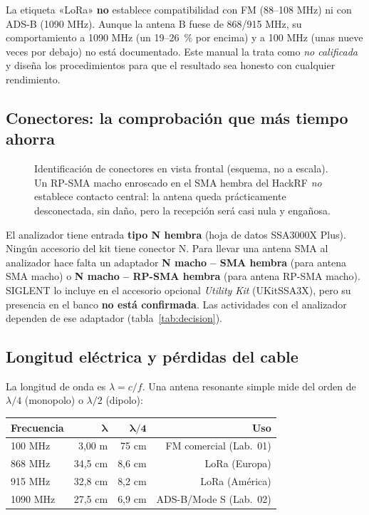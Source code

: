 \begin{importante}
La etiqueta «LoRa» \textbf{no} establece compatibilidad con FM (88--108 MHz) ni con ADS-B (1090 MHz). Aunque la antena B fuese de 868/915 MHz, su comportamiento a 1090 MHz (un 19--26~\% por encima) y a 100 MHz (unas nueve veces por debajo) no está documentado. Este manual la trata como \emph{no calificada} y diseña los procedimientos para que el resultado sea honesto con cualquier rendimiento.
\end{importante}

\subsection{Conectores: la comprobación que más tiempo ahorra}

\begin{figure}[H]
\centering
\resizebox{\linewidth}{!}{}
\caption{Identificación de conectores en vista frontal (esquema, no a escala). Un RP-SMA macho enroscado en el SMA hembra del HackRF \emph{no} establece contacto central: la antena queda prácticamente desconectada, sin daño, pero la recepción será casi nula y engañosa.}
\label{fig:conectores}
\end{figure}

El analizador tiene entrada \textbf{tipo N hembra} (hoja de datos SSA3000X Plus). Ningún accesorio del kit tiene conector N. Para llevar una antena SMA al analizador hace falta un adaptador \textbf{N macho -- SMA hembra} (para antena SMA macho) o \textbf{N macho -- RP-SMA hembra} (para antena RP-SMA macho). SIGLENT lo incluye en el accesorio opcional \emph{Utility Kit} (UKitSSA3X), pero su presencia en el banco \textbf{no está confirmada}. Las actividades con el analizador dependen de ese adaptador (tabla~\ref{tab:decision}).

\subsection{Longitud eléctrica y pérdidas del cable}

La longitud de onda es $\lambda = c/f$. Una antena resonante simple mide del orden de $\lambda/4$ (monopolo) o $\lambda/2$ (dipolo):

\begin{longtable}{@{}lrrr@{}}
\toprule
\textbf{Frecuencia} & $\boldsymbol{\lambda}$ & $\boldsymbol{\lambda/4}$ & \textbf{Uso} \\
\midrule
\endhead
100 MHz & 3,00 m & 75 cm & FM comercial (Lab.\ 01) \\
868 MHz & 34,5 cm & 8,6 cm & LoRa (Europa) \\
915 MHz & 32,8 cm & 8,2 cm & LoRa (América) \\
1090 MHz & 27,5 cm & 6,9 cm & ADS-B/Mode S (Lab.\ 02) \\
\bottomrule
\end{longtable}

